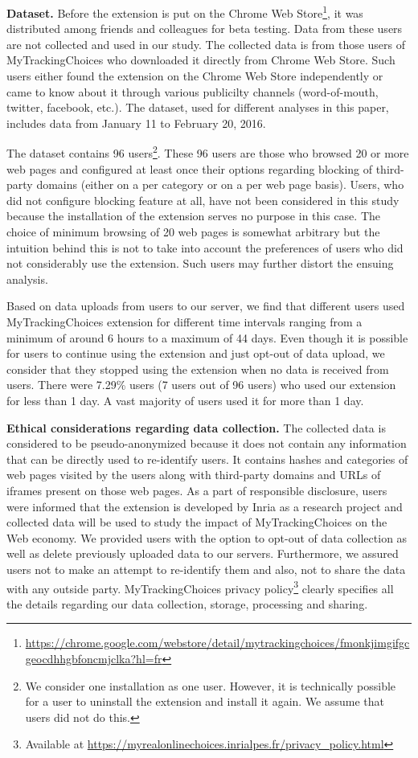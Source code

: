 \documentclass[conference]{IEEEtran}
\begin{document}
\textbf{Dataset.}
Before the extension is put on the Chrome Web Store\footnote{\url{https://chrome.google.com/webstore/detail/mytrackingchoices/fmonkjimgifgcgeocdhhgbfoncmjclka?hl=fr}}, it was distributed among friends and colleagues for beta testing.
Data from these users are not collected and used in our study.
The collected data is from those users of MyTrackingChoices who downloaded it directly from Chrome Web Store. 
Such users either found the extension on the Chrome Web Store independently or came to know about it through various publicilty channels (word-of-mouth, twitter, facebook, etc.).
The dataset, used for different analyses in this paper, includes data from January 11 to February 20, 2016.

The dataset contains 96 users\footnote{We 
consider one installation as one user. 
However, it is technically possible for a user to uninstall the extension and install it again. We assume that users did not do this.}.
These 96 users are those who browsed 20 or more web pages and configured at least once their options regarding blocking of third-party domains (either on a per category or on a per web page basis).
Users, who did not configure blocking feature at all, have not been considered in this study because the installation of the extension serves no purpose in this case.
The choice of minimum browsing of 20 web pages is somewhat arbitrary but the intuition behind this is not to take into account the preferences of users who did not considerably use the extension.
Such users may further distort the ensuing analysis.


Based on data uploads from users to our server, we find that different users used MyTrackingChoices extension for different time intervals ranging from a minimum of around 6 hours to a 
maximum of 44 days.
Even though it is possible for users to continue using the extension and just opt-out of data upload, we consider that they stopped using the extension when no data is received from users.
There were 7.29\% users (7 users out of 96 users) who used our extension for less than 1 day.
A vast majority of users used it for more than 1 day.


\textbf{Ethical considerations regarding data collection.}
The collected data is considered to be pseudo-anonymized because it does not contain any information that can be directly used to re-identify users.
It contains hashes and categories of web pages visited by the users along with third-party domains and URLs of iframes present on those web pages.
As a part of responsible disclosure, users were informed that the extension is developed by Inria as a research project and collected data will be used to study the impact of MyTrackingChoices on the Web economy. 
We provided users with the option to opt-out of data collection as well as delete previously uploaded data to our servers.
Furthermore, we assured users not to make an attempt to re-identify them and also, not to share the data with any outside party.
MyTrackingChoices privacy policy\footnote{Available at \url{https://myrealonlinechoices.inrialpes.fr/privacy_policy.html}} clearly specifies all the details regarding our data collection, storage,
processing and sharing.
\end{document}

